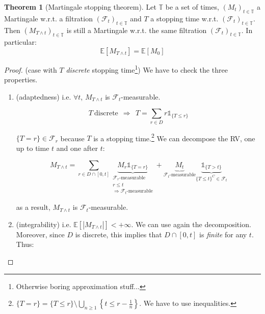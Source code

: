 \documentclass[10pt,a4paper]{article}
\theoremstyle{definition}
\newtheorem{teo}{Theorem}[section]
\newcommand{\ind}{\mathds{1}}
\begin{document}
\begin{teo}
	[Martingale stopping theorem] Let $\mathbb{T}$ be a set of times, $( M_{t})_{t\in \mathbb{T}}$ a Martingale w.r.t. a filtration $(\mathcal{F}_{t})_{t\in \mathbb{T}}$ and $T$ a stopping time w.r.t. $(\mathcal{F}_{t})_{t\in \mathbb{T}}$. Then $( M_{T\land t})_{t\in \mathbb{T}}$ is still a Martingale w.r.t. the same filtration $(\mathcal{F}_{t})_{t\in \mathbb{T}}$. In particular:
	\begin{equation*}
		\mathbb{E}[ M_{T\land t}] =\mathbb{E}[ M_{0}]
	\end{equation*}
\end{teo}
\begin{proof}
	(case with $T$ \textit{discrete} stopping time\footnote{Otherwise boring approximation stuff...}) We have to check the three properties.
	\begin{enumerate}
		\item (adaptedness) i.e. $\forall t$, $M_{T\land t}$ is $\mathcal{F}_{t}$-measurable.
		      
		      \begin{equation*}
		      	T\ \text{discrete} \ \ \Rightarrow \ \ T=\sum\limits _{r\in D} r\ind_{\{T\leq r\}}
		      \end{equation*}
		      
		      $\{T=r\} \in \mathcal{F}_{r}$ because $T$ is a stopping time.\footnote{$\{T=r\} =\{T\leqslant r\} \setminus \bigcup _{n\geqslant 1}\left\{t\leqslant r-\frac{1}{n}\right\}$. We have to use inequalities.} We can decompose the RV, one up to time $t$ and one after $t$:
		      
		      \begin{equation*}
		      	M_{T\land t} =\sum _{r\in D\cap [ 0,t]}\underbrace{M_{r}\ind_{\{T=r\}}}_{ \begin{array}{l}
		      		\mathcal{F}_{r}\text{-measurable}\\
		      		r\leq t\\
		      		\Rightarrow \mathcal{F}_{t}\text{-measurable}
		      		\end{array}} +\underbrace{M_{t}}_{\mathcal{F}_{t}\text{-measurable}}\underbrace{\ind_{\{T >t\}}}_{\{T\leq t\}^{C} \in \mathcal{F}_{t}}
		      \end{equation*}
		      
		      as a result, $M_{T\land t}$ is $\mathcal{F}_{t}$-measurable.
		\item (integrability) i.e. $\mathbb{E}[| M_{T\land t}| ] < +\infty $. We can use again the decomposition. Moreover, since $D$ is discrete, this implies that $D\cap [ 0,t]$ is \textit{finite} for any $t$. Thus:
		      

\end{enumerate}
\end{proof}
\end{document}
